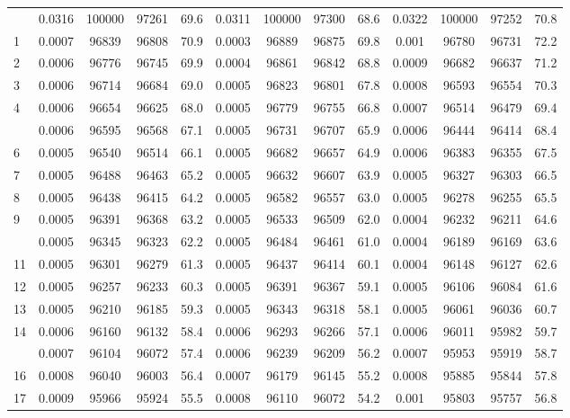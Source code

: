 \documentclass[
  14pt,
]{article}
\begin{document}
\begin{longtable}[t]{lcccccccccccc}
\endfoot
\bottomrule
\endlastfoot
0 & 0.0316 & 100000 & 97261 & 69.6 & 0.0311 & 100000 & 97300 & 68.6 & 0.0322 & 100000 & 97252 & 70.8\\
1 & 0.0007 & 96839 & 96808 & 70.9 & 0.0003 & 96889 & 96875 & 69.8 & 0.001 & 96780 & 96731 & 72.2\\
2 & 0.0006 & 96776 & 96745 & 69.9 & 0.0004 & 96861 & 96842 & 68.8 & 0.0009 & 96682 & 96637 & 71.2\\
3 & 0.0006 & 96714 & 96684 & 69.0 & 0.0005 & 96823 & 96801 & 67.8 & 0.0008 & 96593 & 96554 & 70.3\\
4 & 0.0006 & 96654 & 96625 & 68.0 & 0.0005 & 96779 & 96755 & 66.8 & 0.0007 & 96514 & 96479 & 69.4\\
\addlinespace
5 & 0.0006 & 96595 & 96568 & 67.1 & 0.0005 & 96731 & 96707 & 65.9 & 0.0006 & 96444 & 96414 & 68.4\\
6 & 0.0005 & 96540 & 96514 & 66.1 & 0.0005 & 96682 & 96657 & 64.9 & 0.0006 & 96383 & 96355 & 67.5\\
7 & 0.0005 & 96488 & 96463 & 65.2 & 0.0005 & 96632 & 96607 & 63.9 & 0.0005 & 96327 & 96303 & 66.5\\
8 & 0.0005 & 96438 & 96415 & 64.2 & 0.0005 & 96582 & 96557 & 63.0 & 0.0005 & 96278 & 96255 & 65.5\\
9 & 0.0005 & 96391 & 96368 & 63.2 & 0.0005 & 96533 & 96509 & 62.0 & 0.0004 & 96232 & 96211 & 64.6\\
\addlinespace
10 & 0.0005 & 96345 & 96323 & 62.2 & 0.0005 & 96484 & 96461 & 61.0 & 0.0004 & 96189 & 96169 & 63.6\\
11 & 0.0005 & 96301 & 96279 & 61.3 & 0.0005 & 96437 & 96414 & 60.1 & 0.0004 & 96148 & 96127 & 62.6\\
12 & 0.0005 & 96257 & 96233 & 60.3 & 0.0005 & 96391 & 96367 & 59.1 & 0.0005 & 96106 & 96084 & 61.6\\
13 & 0.0005 & 96210 & 96185 & 59.3 & 0.0005 & 96343 & 96318 & 58.1 & 0.0005 & 96061 & 96036 & 60.7\\
14 & 0.0006 & 96160 & 96132 & 58.4 & 0.0006 & 96293 & 96266 & 57.1 & 0.0006 & 96011 & 95982 & 59.7\\
\addlinespace
15 & 0.0007 & 96104 & 96072 & 57.4 & 0.0006 & 96239 & 96209 & 56.2 & 0.0007 & 95953 & 95919 & 58.7\\
16 & 0.0008 & 96040 & 96003 & 56.4 & 0.0007 & 96179 & 96145 & 55.2 & 0.0008 & 95885 & 95844 & 57.8\\
17 & 0.0009 & 95966 & 95924 & 55.5 & 0.0008 & 96110 & 96072 & 54.2 & 0.001 & 95803 & 95757 & 56.8\\

\end{longtable}
\end{document}
